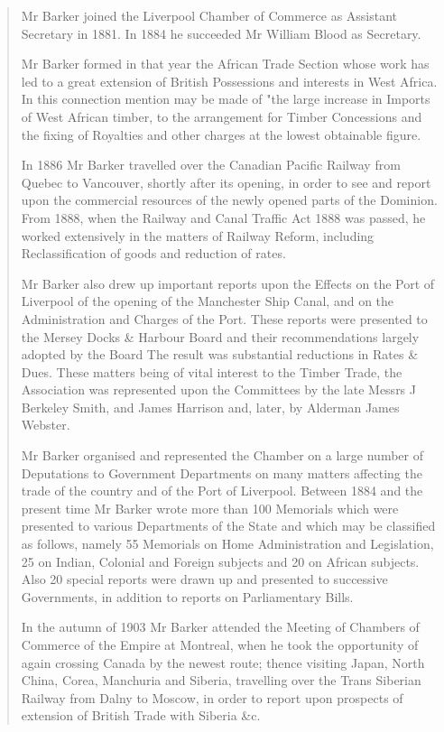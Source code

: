 \begin{quotation}
Mr Barker joined the Liverpool Chamber of Commerce as Assistant Secretary in 1881. In 1884 he succeeded Mr William Blood as Secretary.

Mr Barker formed in that year the African Trade Section whose work has led to a great extension of British Possessions and interests in West Africa. In this connection mention may be made of "the large increase in Imports of West African timber, to the arrangement for Timber Concessions and the fixing of Royalties and other charges at the lowest obtainable figure.

In 1886 Mr Barker travelled over the Canadian Pacific Railway from Quebec to Vancouver, shortly after its opening, in order to see and report upon the commercial resources of the newly opened parts of the Dominion. From 1888, when the Railway and Canal Traffic Act 1888 was passed, he worked extensively in the matters of Railway Reform, including Reclassification of goods and reduction of rates.

Mr Barker also drew up important reports upon the Effects on the Port of Liverpool of the opening of the Manchester Ship Canal, and on the Administration and Charges of the Port. These reports were presented to the Mersey Docks \& Harbour Board and their recommendations largely adopted by the Board The result was substantial reductions in Rates \& Dues. These matters being of vital interest to the Timber Trade, the Association was represented upon the Committees by the late Messrs J Berkeley Smith, and James Harrison and, later, by Alderman James Webster.

Mr Barker organised and represented the Chamber on a large number of Deputations to Government Departments on many matters affecting the trade of the country and of the Port of Liverpool. Between 1884 and the present time Mr Barker wrote more than 100 Memorials which were presented to various Departments of the State and which may be classified as follows, namely 55 Memorials on Home Administration and Legislation, 25 on Indian, Colonial and Foreign subjects and 20 on African subjects. Also 20 special reports were drawn up and presented to successive Governments, in addition to reports on Parliamentary Bills.

In the autumn of 1903 Mr Barker attended the Meeting of Chambers of Commerce of the Empire at Montreal, when he took the opportunity of again crossing Canada by the newest route; thence visiting Japan, North China, Corea, Manchuria and Siberia, travelling over the Trans Siberian Railway from Dalny to Moscow, in order to report upon prospects of extension of British Trade with Siberia \&c.


\end{quotation}
